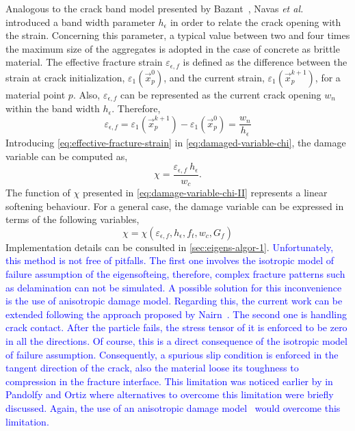 \documentclass[preprint,12pt,a4paper]{elsarticle}
\begin{document}
Analogous to the crack band model presented by
Bazant~\cite{Bazant83}, Navas {\it et al.} \cite{Navas_2018_ES}
\cite{Navas_2017_ES} introduced a band width parameter $h_{\epsilon}$ in order to relate the crack opening with the strain.
Concerning this parameter, a typical value between two and
four times the maximum size of the aggregates is adopted in the case of
concrete as brittle material. The effective fracture strain
$\varepsilon_{\epsilon,f}$ is defined as the difference between the strain at crack initialization,
$\varepsilon_1(\vec{x}_p^{0})$, and the current strain, $\varepsilon_1(\vec{x}_p^{k+1})$, for a material point $p$. Also,
$\varepsilon_{\epsilon,f}$ can be represented as the current crack
opening $w_n$ within the band width $h_{\epsilon}$. Therefore, 
\begin{equation}
  \label{eq:effective-fracture-strain}
  \varepsilon_{\epsilon,f} = \varepsilon_1(\vec{x}_p^{k+1}) -
  \varepsilon_1(\vec{x}_p^{0}) = \frac{w_n}{h_{\epsilon}}
\end{equation}
Introducing \eqref{eq:effective-fracture-strain} in
\eqref{eq:damaged-variable-chi}, the damage variable can be computed
as,
\begin{equation}
  \label{eq:damage-variable-chi-II}
\chi = \frac{\varepsilon_{\epsilon,f}\ h_{\epsilon}}{w_c}.  
\end{equation}
The function of $\chi$ presented in \eqref{eq:damage-variable-chi-II}
represents a linear softening behaviour. For a general case, the
damage variable can be expressed in terms of the following variables,
\begin{equation}
  \label{eq:damage-variable-chi-III}
  \chi = \chi(\varepsilon_{\epsilon,f}, h_{\epsilon}, f_t, w_c, G_f)
\end{equation}
Implementation details can be consulted in \ref{sec:eigens-algor-1}. \textcolor{blue}{Unfortunately, this method is not free of pitfalls. The first one involves the isotropic model of failure assumption of the eigensofteing, therefore, complex fracture patterns such as delamination can not be simulated. A possible solution for this inconvenience is the use of anisotropic damage model. Regarding this, the current work can be extended following the approach proposed by Nairn~\cite{NAIRN_2018}. The second one is handling crack contact. After the particle fails, the stress tensor of it is enforced to be zero in all the directions. Of course, this is a direct consequence of the isotropic model of failure assumption. Consequently, a spurious slip condition is enforced in the tangent direction of the crack, also the material loose its toughness to compression in the fracture interface. This limitation was noticed earlier by in Pandolfy and Ortiz \cite{Pandolfi_2012} where alternatives to overcome this limitation were briefly discussed. Again, the use of an anisotropic damage model~\cite{NAIRN_2018} would overcome this limitation.}
\end{document}
